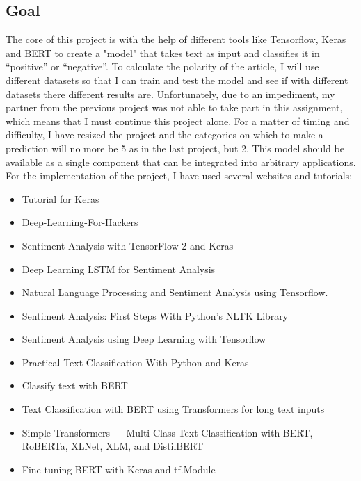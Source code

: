 \subsection[Goal]{Goal}
\label{main}
The core of this project is with the help of different tools like Tensorflow\cite{tensorflow}, Keras and BERT to create a "model" that takes text as input and classifies it in “positive” or “negative”. 
To calculate the polarity of the article, I will use different datasets so that I can train and test the model and see if with different datasets there different results are.
Unfortunately, due to an impediment, my partner from the previous project was not able to take part in this assignment, which means that I must continue this project alone.
For a matter of timing and difficulty, I have resized the project and the categories on which to make a prediction will no more be 5 as in the last project, but 2.
This model should be available as a single component that can be integrated into arbitrary applications.\\
For the implementation of the project, I have used several websites and tutorials:
\begin{itemize}
    \item Tutorial for Keras\cite{tutorial_keras}
    \item Deep-Learning-For-Hackers\cite{git}
    \item Sentiment Analysis with TensorFlow 2 and Keras\cite{tutorial}
    \item Deep Learning LSTM for Sentiment Analysis\cite{karikari_deep_2020}
    \item Natural Language Processing and Sentiment Analysis using Tensorflow.\cite{khan_natural_2020}
    \item Sentiment Analysis: First Steps With Python's NLTK Library \cite{python_sentiment_nodate}
    \item Sentiment Analysis using Deep Learning with Tensorflow \cite{pandey_sentiment_2020}
    \item Practical Text Classification With Python and Keras \cite{python_practical_nodate}
    \item Classify text with BERT \cite{noauthor_classify_nodate}
    \item Text Classification with BERT using Transformers for long text inputs \cite{girdhar_text_2020}
    \item Simple Transformers — Multi-Class Text Classification with BERT, RoBERTa, XLNet, XLM, and DistilBERT \cite{rajapakse_simple_2019}
    \item Fine-tuning BERT with Keras and tf.Module \cite{antyukhov_fine-tuning_2020}
\end{itemize}

